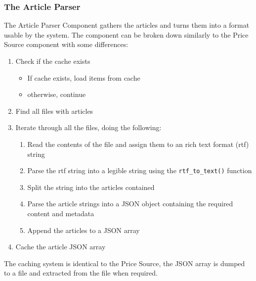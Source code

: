 \subsubsection{The Article Parser}

The Article Parser Component gathers the articles and turns them into a format usable by the system. The component can be broken down similarly to the Price Source component with some differences:
\begin{enumerate}
    \item Check if the cache exists
    \begin{itemize}
        \item If cache exists, load items from cache
        \item otherwise, continue
    \end{itemize}
    \item Find all files with articles
    \item Iterate through all the files, doing the following:
    \begin{enumerate}
        \item Read the contents of the file and assign them to an rich text format (rtf) string
        \item Parse the rtf string into a legible string using the \verb|rtf_to_text()| function
        \item Split the string into the articles contained
        \item Parse the article strings into a JSON object containing the required content and metadata
        \item Append the articles to a JSON array
    \end{enumerate}
    \item Cache the article JSON array
\end{enumerate}

The caching system is identical to the Price Source, the JSON array is dumped to a file and extracted from the file when required.

